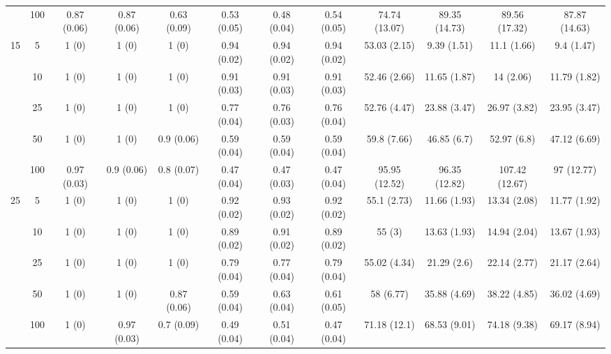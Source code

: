 \documentclass[10pt]{article}
\theoremstyle{definition}
\begin{document}
\begin{table}[H]
\begin{center}
{\begin{tabular}{cc|ccc|ccc|cccc|}
    & 100  & 0.87 (0.06) & 0.87 (0.06) & 0.63 (0.09) & 0.53 (0.05) & 0.48 (0.04) & 0.54 (0.05) & 74.74 (13.07) & 89.35 (14.73) & 89.56 (17.32) & 87.87 (14.63) \\[.3cm]
   \multirow{5}{*}{15}  & 5  & 1 (0) & 1 (0) & 1 (0) & 0.94 (0.02) & 0.94 (0.02) & 0.94 (0.02) & 53.03 (2.15) & 9.39 (1.51) & 11.1 (1.66) & 9.4 (1.47) \\ 
    & 10  & 1 (0) & 1 (0) & 1 (0) & 0.91 (0.03) & 0.91 (0.03) & 0.91 (0.03) & 52.46 (2.66) & 11.65 (1.87) & 14 (2.06) & 11.79 (1.82) \\ 
    & 25  & 1 (0) & 1 (0) & 1 (0) & 0.77 (0.04) & 0.76 (0.03) & 0.76 (0.04) & 52.76 (4.47) & 23.88 (3.47) & 26.97 (3.82) & 23.95 (3.47) \\ 
    & 50  & 1 (0) & 1 (0) & 0.9 (0.06) & 0.59 (0.04) & 0.59 (0.04) & 0.59 (0.04) & 59.8 (7.66) & 46.85 (6.7) & 52.97 (6.8) & 47.12 (6.69) \\ 
    & 100  & 0.97 (0.03) & 0.9 (0.06) & 0.8 (0.07) & 0.47 (0.04) & 0.47 (0.03) & 0.47 (0.04) & 95.95 (12.52) & 96.35 (12.82) & 107.42 (12.67) & 97 (12.77) \\[.3cm]
   \multirow{5}{*}{25}  & 5  & 1 (0) & 1 (0) & 1 (0) & 0.92 (0.02) & 0.93 (0.02) & 0.92 (0.02) & 55.1 (2.73) & 11.66 (1.93) & 13.34 (2.08) & 11.77 (1.92) \\ 
    & 10  & 1 (0) & 1 (0) & 1 (0) & 0.89 (0.02) & 0.91 (0.02) & 0.89 (0.02) & 55 (3) & 13.63 (1.93) & 14.94 (2.04) & 13.67 (1.93) \\ 
    & 25  & 1 (0) & 1 (0) & 1 (0) & 0.79 (0.04) & 0.77 (0.04) & 0.79 (0.04) & 55.02 (4.34) & 21.29 (2.6) & 22.14 (2.77) & 21.17 (2.64) \\ 
   & 50  & 1 (0) & 1 (0) & 0.87 (0.06) & 0.59 (0.04) & 0.63 (0.04) & 0.61 (0.05) & 58 (6.77) & 35.88 (4.69) & 38.22 (4.85) & 36.02 (4.69) \\ 
    & 100  & 1 (0) & 0.97 (0.03) & 0.7 (0.09) & 0.49 (0.04) & 0.51 (0.04) & 0.47 (0.04) & 71.18 (12.1) & 68.53 (9.01) & 74.18 (9.38) & 69.17 (8.94) \\ 
\end{tabular}}
   \end{center}
      \vspace{-.5cm}
\end{table}
\end{document}
